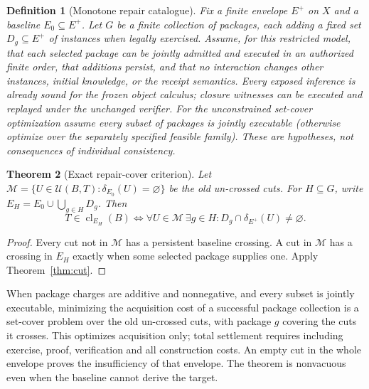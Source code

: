 \documentclass[11pt]{article}
\newtheorem{theorem}{Theorem}[section]
\newtheorem{definition}[theorem]{Definition}
\theoremstyle{remark}\newtheorem{remark}[theorem]{Remark}
\newcommand{\cl}{\operatorname{cl}}
\newcommand{\cU}{\mathcal U}
\begin{document}
\begin{definition}[Monotone repair catalogue]
Fix a finite envelope $E^+$ on $X$ and a baseline $E_0\subseteq E^+$. Let $G$ be a finite collection of packages, each adding a fixed set $D_g\subseteq E^+$ of instances when legally exercised. Assume, for this restricted model, that each selected package can be jointly admitted and executed in an authorized finite order, that additions persist, and that no interaction changes other instances, initial knowledge, or the receipt semantics. Every exposed inference is already sound for the frozen object calculus; closure witnesses can be executed and replayed under the unchanged verifier. For the unconstrained set-cover optimization assume every subset of packages is jointly executable (otherwise optimize over the separately specified feasible family). These are hypotheses, not consequences of individual consistency.
\end{definition}
\begin{theorem}[Exact repair-cover criterion]\label{thm:repair}
Let $\mathcal M=\{U\in\cU(B,T):\delta_{E_0}(U)=\varnothing\}$ be the old un-crossed cuts. For $H\subseteq G$, write $E_H=E_0\cup\bigcup_{g\in H}D_g$. Then
\[
T\in\cl_{E_H}(B)\iff
\forall U\in\mathcal M\ \exists g\in H:
D_g\cap\delta_{E^+}(U)\ne\varnothing.
\]
\end{theorem}
\begin{proof}
Every cut not in $\mathcal M$ has a persistent baseline crossing. A cut in $\mathcal M$ has a crossing in $E_H$ exactly when some selected package supplies one. Apply Theorem~\ref{thm:cut}.
\end{proof}
When package charges are additive and nonnegative, and every subset is jointly executable, minimizing the acquisition cost of a successful package collection is a set-cover problem over the old un-crossed cuts, with package $g$ covering the cuts it crosses. This optimizes acquisition only; total settlement requires including exercise, proof, verification and all construction costs. An empty cut in the whole envelope proves the insufficiency of that envelope. The theorem is nonvacuous even when the baseline cannot derive the target.
\end{document}
